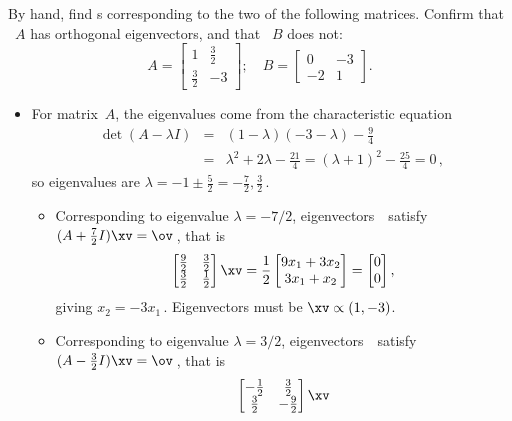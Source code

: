 \begin{example} \label{eg:2x2orthevec}
By hand, find s corresponding to the two  of the following matrices.
Confirm that ~\(A\) has orthogonal eigenvectors, and that ~\(B\) does not:
\begin{equation*}
A=\begin{bmatrix} 1&\frac32\\\frac32&-3 \end{bmatrix};\quad
B=\begin{bmatrix} 0&-3\\-2&1 \end{bmatrix}.
\end{equation*}

\begin{solution} 
\begin{itemize}
\item For matrix~\(A\), the eigenvalues come from the characteristic equation
\begin{eqnarray*}
\det(A-\lambda I)&=&(1-\lambda)(-3-\lambda)-\tfrac94
\\&=&\lambda^2+2\lambda-\tfrac{21}4
=(\lambda+1)^2-\tfrac{25}4=0\,,
\end{eqnarray*}
so eigenvalues are \(\lambda=-1\pm\tfrac52=-\tfrac72,\tfrac32\)\,.
\begin{itemize}
\item Corresponding to eigenvalue \(\lambda=-7/2\), eigenvectors~\xv\ satisfy \((A+\tfrac72I)\xv=\ov\)\,, that is
\begin{equation*}
\begin{bmatrix} \frac92&\frac32\\\frac32&\frac12 \end{bmatrix}\xv
=\frac12\begin{bmatrix} 9x_1+3x_2\\3x_1+x_2 \end{bmatrix}
=\begin{bmatrix} 0\\0 \end{bmatrix},
\end{equation*}
giving \(x_2=-3x_1\)\,.  
Eigenvectors must be \(\xv\propto(1,-3)\).
\item Corresponding to eigenvalue \(\lambda=3/2\), eigenvectors~\xv\ satisfy \((A-\tfrac32I)\xv=\ov\)\,, that is
\begin{equation*}
\begin{bmatrix} -\frac12&\frac32\\\frac32&-\frac92 \end{bmatrix}\xv

\end{equation*}
\end{itemize}
\end{itemize}
\end{solution}
\end{example}

